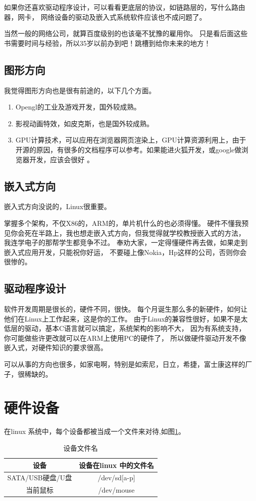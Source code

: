 \documentclass[UTF8,a4paper,12pt]{ctexbook}
\begin{document}
			如果你还喜欢驱动程序设计，可以看看更底层的协议，如链路层的，写什么路由器，网卡， 网络设备的驱动及嵌入式系统软件应该也不成问题了。
			
			当然一般的网络公司，就算百度级别的也该毫不犹豫的雇用你。 只是看后面这些书需要时间与经验，所以35岁以前办到吧！跳槽到给你未来的地方！
			
		\subsection{图形方向}我觉得图形方向也是很有前途的，以下几个方面。
			\begin{enumerate}
				\item Opengl的工业及游戏开发，国外较成熟。
				\item 影视动画特效，如皮克斯，也是国外较成熟。
				\item GPU计算技术，可以应用在浏览器网页渲染上，GPU计算资源利用上，由于开源的原因，有很多的文档程序可以参考。如果能进火狐开发，或google做浏览器开发，应该会很好 。
			\end{enumerate}
			
		\subsection{嵌入式方向}嵌入式方向没说的，Linux很重要。
			
			掌握多个架构，不仅X86的，ARM的，单片机什么的也必须得懂。 硬件不懂我预见你会死在半路上，我也想走嵌入式方向，但我觉得就学校教授嵌入式的方法， 我连学电子的那帮学生都竞争不过。 奉劝大家，一定得懂硬件再去做，如果走到嵌入式应用开发，只能祝你好运， 不要碰上像Nokia，Hp这样的公司，否则你会很惨的。
			
		\subsection{驱动程序设计}	
			软件开发周期是很长的，硬件不同，很快。 每个月诞生那么多的新硬件，如何让他们在Linux上工作起来，这是你的工作。 由于Linux的兼容性很好，如果不是太低层的驱动，基本C语言就可以搞定，系统架构的影响不大， 因为有系统支持，你可能做些许更改就可以在ARM上使用PC的硬件了， 所以做硬件驱动开发不像嵌入式，对硬件知识的要求很高。
			
			可以从事的方向也很多，如家电啊，特别是如索尼，日立，希捷，富士康这样的厂子，很稀缺的。
		
	\section{硬件设备}
			在linux 系统中，每个设备都被当成一个文件来对待,如图\ref{Name_linux}。
			\begin{table}[H]
				\centering
				\begin{tabular}{c|c}
					\hline
						设备 &  设备在linux 中的文件名 \\
					\hline
						SATA/USB硬盘/U盘 &  /dev/sd[a-p] \\
						当前鼠标 &  /dev/mouse \\
					\hline
				\end{tabular}
				\caption{设备文件名}
				\label{Name_linux}
			\end{table}
\end{document}
